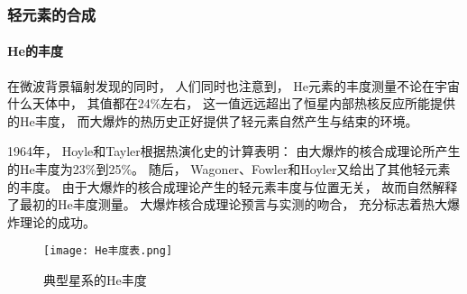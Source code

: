 \documentclass[8pt]{beamer}
\begin{document}
        \begin{frame}[fragile]
            \frametitle{轻元素的合成}
            \framesubtitle{He的丰度}
            \begin{multicols}{2} 
                \qquad
                在微波背景辐射发现的同时，
                人们同时也注意到，
                He元素的丰度测量不论在宇宙什么天体中，
                其值都在24\%左右，
                这一值远远超出了恒星内部热核反应所能提供的He丰度，
                而大爆炸的热历史正好提供了轻元素自然产生与结束的环境。

                \qquad
                1964年，
                Hoyle和Tayler根据热演化史的计算表明：
                由大爆炸的核合成理论所产生的He丰度为23\%到25\%。
                随后，
                Wagoner、Fowler和Hoyler又给出了其他轻元素的丰度。
                由于大爆炸的核合成理论产生的轻元素丰度与位置无关，
                故而自然解释了最初的He丰度测量。
                大爆炸核合成理论预言与实测的吻合，
                充分标志着热大爆炸理论的成功。

                \begin{figure}[h]
                    \centering
                    \texttt{[image: He丰度表.png]}  
                    \caption{典型星系的He丰度}
                \end{figure}
            \end{multicols}
        \end{frame}
\end{document}

